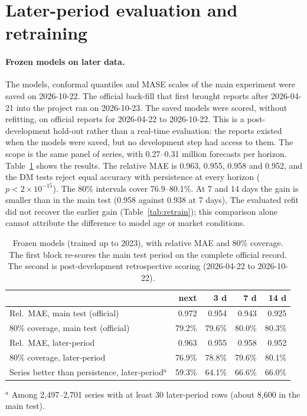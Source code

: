 \section{Later-period evaluation and retraining}\label{sec:prospective}

\paragraph{Frozen models on later data.}
The models, conformal quantiles and MASE scales of the main experiment were saved on 2026-10-22. The official back-fill that first brought reports after 2026-04-21 into the project ran on 2026-10-23.
The saved models were scored, without refitting, on official reports for 2026-04-22 to 2026-10-22.
This is a post-development hold-out rather than a real-time evaluation: the reports existed when the models were saved, but no development step had access to them.
The scope is the same panel of series, with 0.27--0.31 million forecasts per horizon.
Table~\ref{tab:prosp} shows the results. The relative MAE is 0.963, 0.955, 0.958 and 0.952, and the DM tests reject equal accuracy with persistence at every horizon ($p<2\times10^{-15}$).
The 80\% intervals cover 76.9--80.1\%.
At 7 and 14 days the gain is smaller than in the main test (0.958 against 0.938 at 7 days), The evaluated refit did not recover the earlier gain (Table~\ref{tab:retrain}); this comparison alone cannot attribute the difference to model age or market conditions.

\begin{table}[t]\centering\small\setlength{\tabcolsep}{4pt}
\caption{Frozen models (trained up to 2023), with relative MAE and 80\% coverage. The first block re-scores the main test period on the complete official record. The second is post-development retrospective scoring (2026-04-22 to 2026-10-22).}\label{tab:prosp}
\begin{tabular}{@{}lrrrr@{}}\toprule
 & next & 3 d & 7 d & 14 d\\\midrule
Rel.\ MAE, main test (official) & 0.972 & 0.954 & 0.943 & 0.925\\
80\% coverage, main test (official) & 79.2\% & 79.6\% & 80.0\% & 80.3\%\\
Rel.\ MAE, later-period & 0.963 & 0.955 & 0.958 & 0.952\\
80\% coverage, later-period & 76.9\% & 78.8\% & 79.6\% & 80.1\%\\
Series better than persistence, later-period$^a$ & 59.3\% & 64.1\% & 66.6\% & 66.0\%\\\bottomrule
\end{tabular}
\par\smallskip\footnotesize $^a$ Among 2,497--2,701 series with at least 30 later-period rows (about 8,600 in the main test).\end{table}

